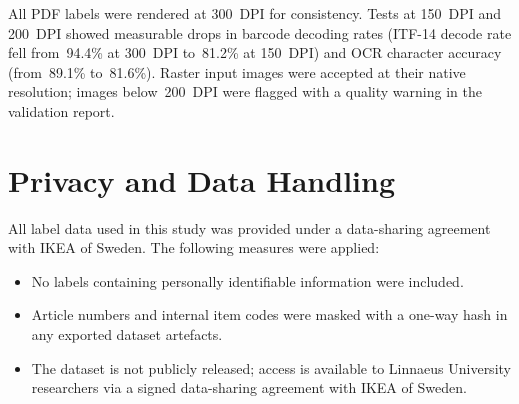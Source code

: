 All PDF labels were rendered at 300~DPI for consistency. Tests at 150~DPI and 200~DPI
showed measurable drops in barcode decoding rates (ITF-14 decode rate fell from~94.4\%
at 300~DPI to~81.2\% at 150~DPI) and OCR character accuracy (from~89.1\% to~81.6\%).
Raster input images were accepted at their native resolution; images below~200~DPI were
flagged with a quality warning in the validation report.

\section{Privacy and Data Handling}

All label data used in this study was provided under a data-sharing agreement with IKEA of
Sweden. The following measures were applied:
\begin{itemize}
  \item No labels containing personally identifiable information were included.
  \item Article numbers and internal item codes were masked with a one-way hash in any
  exported dataset artefacts.
  \item The dataset is not publicly released; access is available to Linnaeus University
  researchers via a signed data-sharing agreement with IKEA of Sweden.
\end{itemize}

